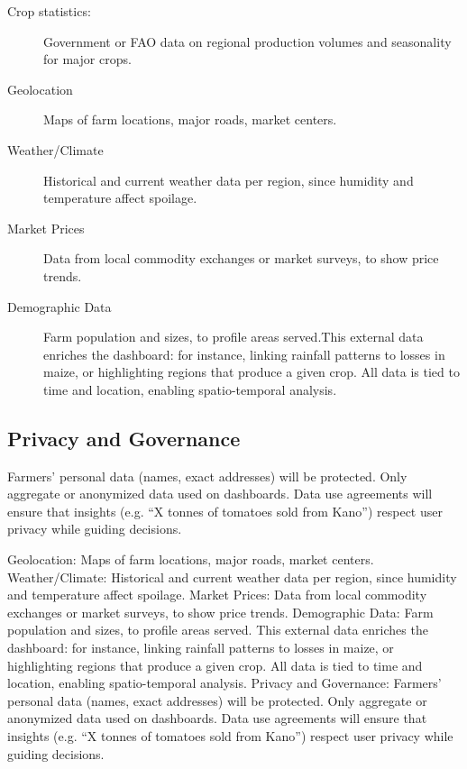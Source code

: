 {\begin{description}
    \item[Crop statistics:]  Government or FAO data on regional production volumes and seasonality for major crops.
    
    \item[Geolocation] Maps of farm locations, major roads, market centers.
    
    \item[Weather/Climate] Historical and current weather data per region, since humidity and temperature affect spoilage.
    \item[Market Prices]  Data from local commodity exchanges or market surveys, to show price trends.
    \item[Demographic Data] Farm population and sizes, to profile areas served.This external data enriches the dashboard: for instance, linking rainfall patterns to losses in maize, or highlighting regions that produce a given crop. All data is tied to time and location, enabling spatio-temporal analysis.
\end{description}

\subsection{Privacy and Governance}
Farmers’ personal data (names, exact addresses) will be protected. Only aggregate or anonymized data used on dashboards. Data use agreements will ensure that insights (e.g. “X tonnes of tomatoes sold from Kano”) respect user privacy while guiding decisions.




Geolocation: Maps of farm locations, major roads, market centers.
Weather/Climate: Historical and current weather data per region, since humidity and temperature affect spoilage.
Market Prices: Data from local commodity exchanges or market surveys, to show price trends.
Demographic Data: Farm population and sizes, to profile areas served.
This external data enriches the dashboard: for instance, linking rainfall patterns to losses in maize, or highlighting regions that produce a given crop. All data is tied to time and location, enabling spatio-temporal analysis.
Privacy and Governance: Farmers’ personal data (names, exact addresses) will be protected. Only aggregate or anonymized data used on dashboards. Data use agreements will ensure that insights (e.g. “X tonnes of tomatoes sold from Kano”) respect user privacy while guiding decisions.

}